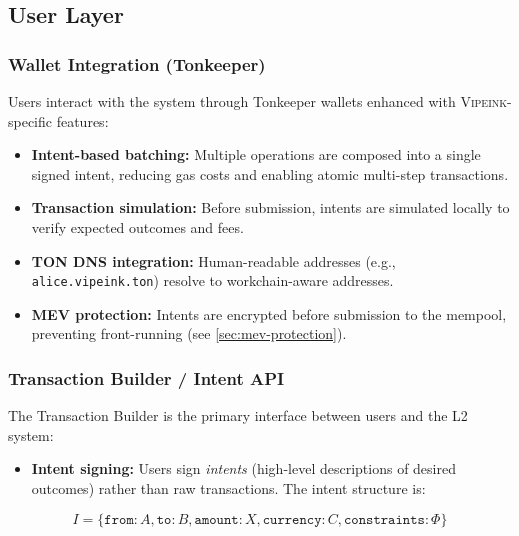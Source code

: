 \documentclass[12pt,a4paper]{article}
\theoremstyle{definition}
\theoremstyle{remark}
\newcommand{\Vipeink}{\textsc{Vipeink}}
\begin{document}
\subsection{User Layer}
\label{sec:user-layer}

\subsubsection{Wallet Integration (Tonkeeper)}

Users interact with the system through Tonkeeper wallets enhanced with \Vipeink{}-specific features:

\begin{itemize}[nosep]
    \item \textbf{Intent-based batching:} Multiple operations are composed into a single signed intent, reducing gas costs and enabling atomic multi-step transactions.
    \item \textbf{Transaction simulation:} Before submission, intents are simulated locally to verify expected outcomes and fees.
    \item \textbf{TON DNS integration:} Human-readable addresses (e.g., \texttt{alice.vipeink.ton}) resolve to workchain-aware addresses.
    \item \textbf{MEV protection:} Intents are encrypted before submission to the mempool, preventing front-running (see \cref{sec:mev-protection}).
\end{itemize}

\subsubsection{Transaction Builder / Intent API}

The Transaction Builder is the primary interface between users and the L2 system:

\begin{itemize}[nosep]
    \item \textbf{Intent signing:} Users sign \emph{intents} (high-level descriptions of desired outcomes) rather than raw transactions. The intent structure is:
\end{itemize}
\begin{equation}
I = \{\texttt{from}: A, \texttt{to}: B, \texttt{amount}: X, \texttt{currency}: C, \texttt{constraints}: \Phi\}
\end{equation}
\end{document}
